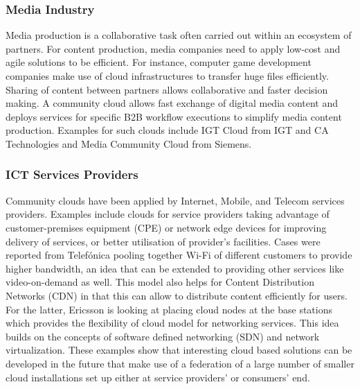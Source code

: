 \subsubsection{Media Industry}
Media production is a collaborative task often carried out within an ecosystem of partners. 
For content production, media companies need to apply low-cost and agile solutions to be efficient. 
For instance, computer game development companies make use of cloud infrastructures to transfer huge files efficiently. 
Sharing of content between partners allows collaborative and faster decision making. 
A community cloud allows fast exchange of digital media content and deploys services for specific B2B workflow executions to simplify media content production. 
Examples for such clouds include IGT Cloud from IGT and CA Technologies and Media Community Cloud from Siemens.


\subsubsection{ICT Services Providers}
Community clouds have been applied by Internet, Mobile, and Telecom services providers.
Examples include clouds for service providers taking advantage of customer-premises equipment (CPE) or network edge devices for improving delivery of services, or better utilisation of provider's facilities.
Cases were reported from Telef\'{o}nica pooling together Wi-Fi of different customers to provide higher bandwidth, an idea that can be extended to providing other services like video-on-demand as well. 
This model also helps for Content Distribution Networks (CDN) in that this can allow to distribute content efficiently for users. 
For the latter, Ericsson is looking at placing cloud nodes at the base stations which provides the flexibility of cloud model for networking services.
This idea builds on the concepts of software defined networking (SDN) and network virtualization. 
These examples show that interesting cloud based solutions can be developed in the future that make use of a federation of a large number of smaller cloud installations set up either at service providers' or consumers' end.


